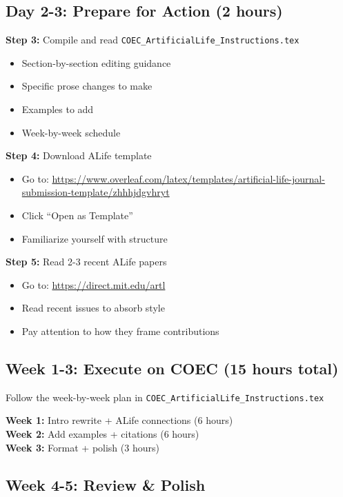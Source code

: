 \documentclass[11pt]{article}
\begin{document}
\subsection*{Day 2-3: Prepare for Action (2 hours)}

\textbf{Step 3:} Compile and read \texttt{COEC\_ArtificialLife\_Instructions.tex}
\begin{itemize}
    \item Section-by-section editing guidance
    \item Specific prose changes to make
    \item Examples to add
    \item Week-by-week schedule
\end{itemize}

\textbf{Step 4:} Download ALife template
\begin{itemize}
    \item Go to: \url{https://www.overleaf.com/latex/templates/artificial-life-journal-submission-template/zhhhjdgvhryt}
    \item Click ``Open as Template''
    \item Familiarize yourself with structure
\end{itemize}

\textbf{Step 5:} Read 2-3 recent ALife papers
\begin{itemize}
    \item Go to: \url{https://direct.mit.edu/artl}
    \item Read recent issues to absorb style
    \item Pay attention to how they frame contributions
\end{itemize}

\subsection*{Week 1-3: Execute on COEC (15 hours total)}

Follow the week-by-week plan in \texttt{COEC\_ArtificialLife\_Instructions.tex}

\textbf{Week 1:} Intro rewrite + ALife connections (6 hours)\\
\textbf{Week 2:} Add examples + citations (6 hours)\\
\textbf{Week 3:} Format + polish (3 hours)

\subsection*{Week 4-5: Review \& Polish}
\end{document}
